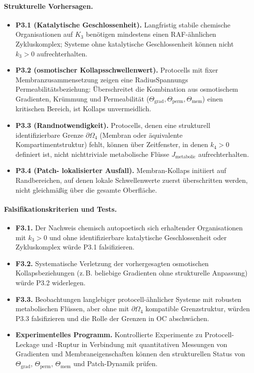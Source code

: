 {\paragraph{Strukturelle Vorhersagen.}
\begin{itemize}
  \item \textbf{P3.1 (Katalytische Geschlossenheit).}
        Langfristig stabile chemische Organisationen auf \(K_3\) benötigen mindestens
        einen RAF-ähnlichen Zykluskomplex; Systeme ohne katalytische Geschlossenheit
        können nicht \(k_3>0\) aufrechterhalten.
  \item \textbf{P3.2 (osmotischer Kollapsschwellenwert).}
        Protocells mit fixer Membranzusammensetzung zeigen eine Radius\-Spannungs\-
        Permeabilitätsbeziehung: Überschreitet die Kombination aus osmotischem
        Gradienten, Krümmung und Permeabilität
        (\(\Theta_{\mathrm{grad}}, \Theta_{\mathrm{perm}}, \Theta_{\mathrm{mem}}\))
        einen kritischen Bereich, ist Kollaps unvermeidlich.
  \item \textbf{P3.3 (Randnotwendigkeit).}
        Protocells, denen eine strukturell identifizierbare Grenze
        \(\partial\Omega_4\) (Membran oder äquivalente Kompartimentstruktur)
        fehlt, können über Zeitfenster, in denen \(k_4>0\) definiert ist,
nicht nichttriviale metabolische Flüsse \(J_{\mathrm{metabolic}}\) aufrechterhalten.
  \item \textbf{P3.4 (Patch- lokalisierter Ausfall).}
        Membran-Kollaps initiiert auf Randbereichen, auf denen lokale Schwellenwerte
        zuerst überschritten werden, nicht gleichmäßig über die gesamte Oberfläche.
\end{itemize}

\paragraph{Falsifikationskriterien und Tests.}
\begin{itemize}
  \item \textbf{F3.1.}
        Der Nachweis chemisch autopoetisch sich erhaltender Organisationen mit
        \(k_3>0\) und ohne identifizierbare katalytische Geschlossenheit oder
        Zykluskomplex würde P3.1 falsifizieren.
  \item \textbf{F3.2.}
        Systematische Verletzung der vorhergesagten osmotischen
        Kollapsbeziehungen (z.\,B. beliebige Gradienten ohne strukturelle Anpassung)
        würde P3.2 widerlegen.
  \item \textbf{F3.3.}
        Beobachtungen langlebiger protocell-ähnlicher Systeme mit robusten
        metabolischen Flüssen, aber ohne mit \(\partial\Omega_4\) kompatible
        Grenzstruktur, würden P3.3 falsifizieren und die Rolle der Grenzen in
        OC abschwächen.
  \item \textbf{Experimentelles Programm.}
        Kontrollierte Experimente zu Protocell-Leckage und -Ruptur in Verbindung mit
        quantitativen Messungen von Gradienten und Membraneigenschaften können den
        strukturellen Status von \(\Theta_{\mathrm{grad}}\),
        \(\Theta_{\mathrm{perm}}\), \(\Theta_{\mathrm{mem}}\) und Patch-Dynamik prüfen.
\end{itemize}

}
